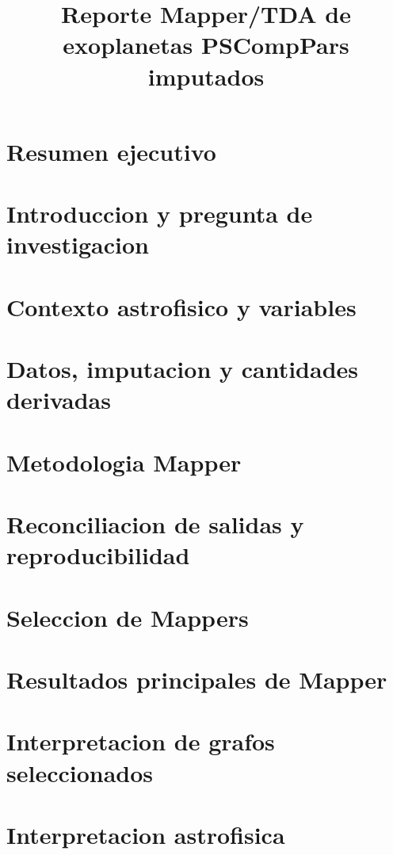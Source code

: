 \documentclass[11pt]{article}
\title{Reporte Mapper/TDA de exoplanetas PSCompPars imputados}
\author{}
\date{}
\begin{document}
\maketitle

\newpage
\section{Resumen ejecutivo}

\newpage
\section{Introduccion y pregunta de investigacion}

\section{Contexto astrofisico y variables}

\section{Datos, imputacion y cantidades derivadas}

\section{Metodologia Mapper}

\section{Reconciliacion de salidas y reproducibilidad}

\section{Seleccion de Mappers}

\section{Resultados principales de Mapper}

\section{Interpretacion de grafos seleccionados}

\section{Interpretacion astrofisica}

\end{document}
